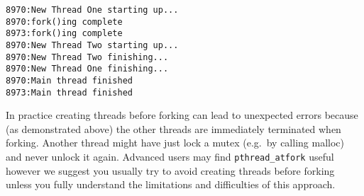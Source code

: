 \begin{Shaded}
\end{Shaded}

\begin{verbatim}
8970:New Thread One starting up...
8970:fork()ing complete
8973:fork()ing complete
8970:New Thread Two starting up...
8970:New Thread Two finishing...
8970:New Thread One finishing...
8970:Main thread finished
8973:Main thread finished
\end{verbatim}

In practice creating threads before forking can lead to unexpected
errors because (as demonstrated above) the other threads are immediately
terminated when forking. Another thread might have just lock a mutex
(e.g.~by calling malloc) and never unlock it again. Advanced users may
find \texttt{pthread\_atfork} useful however we suggest you usually try
to avoid creating threads before forking unless you fully understand the
limitations and difficulties of this approach.

